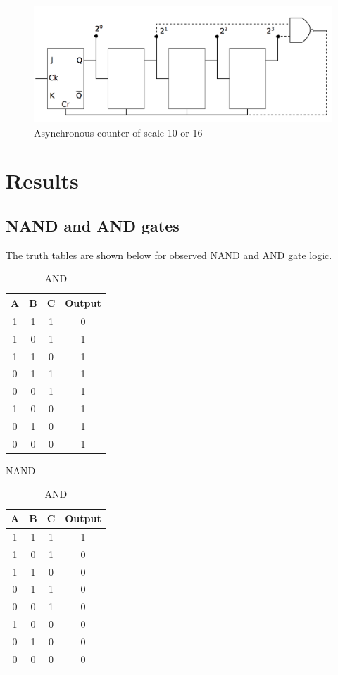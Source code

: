 \documentclass{article}
\begin{document}
\begin{figure}[h]
    \centering
    \includegraphics[width = \textwidth]{counter.png}
    \caption{Asynchronous counter of scale 10 or 16}
    \label{fig:7}
\end{figure}

\section{Results}
    \subsection*{NAND and AND gates}
    The truth tables are shown below for observed NAND and AND gate logic.\\
\vspace{2mm}    
\centering
\begin{table}[h]
\centering
\parbox{.45\linewidth}{
    \centering
    \begin{tabular}{c c c|c}
    A & B & C & Output\\
    \hline
    1&1&1&0\\
    1&0&1&1\\
    1&1&0&1\\
    0&1&1&1\\
    0&0&1&1\\
    1&0&0&1\\
    0&1&0&1\\
    0&0&0&1\\
    \end{tabular}
    \caption{NAND}
    \label{tab:1}
}   
\parbox{.45\linewidth}{
    \centering
    \begin{tabular}{c c c|c}
    A & B & C & Output\\
    \hline
    1&1&1&1\\
    1&0&1&0\\
    1&1&0&0\\
    0&1&1&0\\
    0&0&1&0\\
    1&0&0&0\\
    0&1&0&0\\
    0&0&0&0\\
    \end{tabular}
    \caption{AND}
    \label{tab:2}
}   
\end{table}
\end{document}
